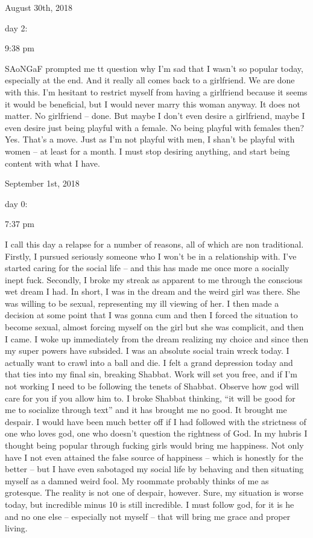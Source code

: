\bigskip
\bigskip
August 30th, 2018

day 2:

9:38 pm

SAoNGaF prompted me tt question why I'm sad that I wasn't so popular
today, especially at the end. And it really all comes back to a
girlfriend. We are done with this. I'm hesitant to restrict myself from
having a girlfriend because it seems it would be beneficial, but I would
never marry this woman anyway. It does not matter. No girlfriend --
done. But maybe I don't even desire a girlfriend, maybe I even desire
just being playful with a female. No being playful with females then?
Yes. That's a move. Just as I'm not playful with men, I shan't be
playful with women -- at least for a month. I must stop desiring
anything, and start being content with what I have.

\bigskip
\bigskip
September 1st, 2018

day 0:

7:37 pm

I call this day a relapse for a number of reasons, all of which are non
traditional. Firstly, I pursued seriously someone who I won't be in a
relationship with. I've started caring for the social life -- and this
has made me once more a socially inept fuck. Secondly, I broke my streak
as apparent to me through the conscious wet dream I had. In short, I was
in the dream and the weird girl was there. She was willing to be sexual,
representing my ill viewing of her. I then made a decision at some point
that I was gonna cum and then I forced the situation to become sexual,
almost forcing myself on the girl but she was complicit, and then I
came. I woke up immediately from the dream realizing my choice and since
then my super powers have subsided. I was an absolute social train wreck
today. I actually want to crawl into a ball and die. I felt a grand
depression today and that ties into my final sin, breaking Shabbat. Work
will set you free, and if I'm not working I need to be following the
tenets of Shabbat. Observe how god will care for you if you allow him
to. I broke Shabbat thinking, ``it will be good for me to socialize
through text'' and it has brought me no good. It brought me despair. I
would have been much better off if I had followed with the strictness of
one who loves god, one who doesn't question the rightness of God. In my
hubris I thought being popular through fucking girls would bring me
happiness. Not only have I not even attained the false source of
happiness -- which is honestly for the better -- but I have even
sabotaged my social life by behaving and then situating myself as a
damned weird fool. My roommate probably thinks of me as grotesque. The
reality is not one of despair, however. Sure, my situation is worse
today, but incredible minus 10 is still incredible. I must follow god,
for it is he and no one else -- especially not myself -- that will bring
me grace and proper living.


